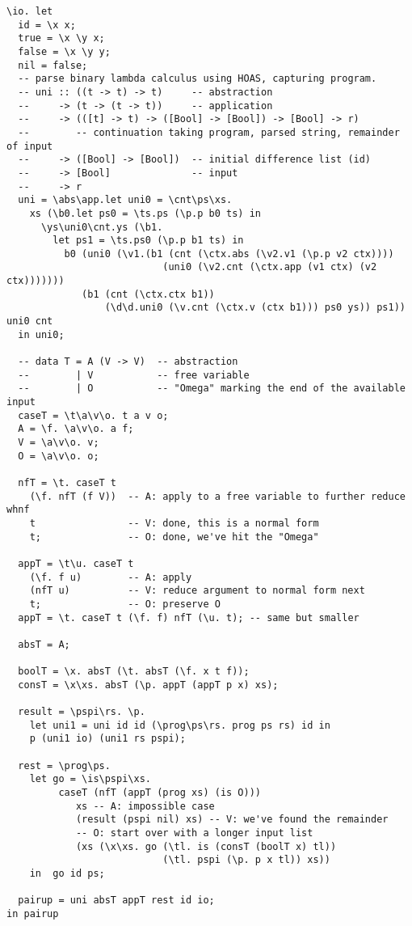 \documentclass{article}
\begin{document}
{\small
\begin{verbatim}
\io. let
  id = \x x;
  true = \x \y x;
  false = \x \y y;
  nil = false;
  -- parse binary lambda calculus using HOAS, capturing program.
  -- uni :: ((t -> t) -> t)     -- abstraction
  --     -> (t -> (t -> t))     -- application
  --     -> (([t] -> t) -> ([Bool] -> [Bool]) -> [Bool] -> r)
  --        -- continuation taking program, parsed string, remainder of input
  --     -> ([Bool] -> [Bool])  -- initial difference list (id)
  --     -> [Bool]              -- input
  --     -> r
  uni = \abs\app.let uni0 = \cnt\ps\xs.
    xs (\b0.let ps0 = \ts.ps (\p.p b0 ts) in
      \ys\uni0\cnt.ys (\b1.
        let ps1 = \ts.ps0 (\p.p b1 ts) in
          b0 (uni0 (\v1.(b1 (cnt (\ctx.abs (\v2.v1 (\p.p v2 ctx))))
                           (uni0 (\v2.cnt (\ctx.app (v1 ctx) (v2 ctx)))))))
             (b1 (cnt (\ctx.ctx b1))
                 (\d\d.uni0 (\v.cnt (\ctx.v (ctx b1))) ps0 ys)) ps1)) uni0 cnt
  in uni0;

  -- data T = A (V -> V)  -- abstraction
  --        | V           -- free variable
  --        | O           -- "Omega" marking the end of the available input
  caseT = \t\a\v\o. t a v o;
  A = \f. \a\v\o. a f;
  V = \a\v\o. v;
  O = \a\v\o. o;

  nfT = \t. caseT t
    (\f. nfT (f V))  -- A: apply to a free variable to further reduce whnf
    t                -- V: done, this is a normal form
    t;               -- O: done, we've hit the "Omega"

  appT = \t\u. caseT t
    (\f. f u)        -- A: apply
    (nfT u)          -- V: reduce argument to normal form next
    t;               -- O: preserve O
  appT = \t. caseT t (\f. f) nfT (\u. t); -- same but smaller

  absT = A;

  boolT = \x. absT (\t. absT (\f. x t f));
  consT = \x\xs. absT (\p. appT (appT p x) xs);

  result = \pspi\rs. \p.
    let uni1 = uni id id (\prog\ps\rs. prog ps rs) id in
    p (uni1 io) (uni1 rs pspi);

  rest = \prog\ps.
    let go = \is\pspi\xs.
         caseT (nfT (appT (prog xs) (is O)))
            xs -- A: impossible case
            (result (pspi nil) xs) -- V: we've found the remainder
            -- O: start over with a longer input list
            (xs (\x\xs. go (\tl. is (consT (boolT x) tl))
                           (\tl. pspi (\p. p x tl)) xs))
    in  go id ps;

  pairup = uni absT appT rest id io;
in pairup
\end{verbatim}
}
\end{document}

